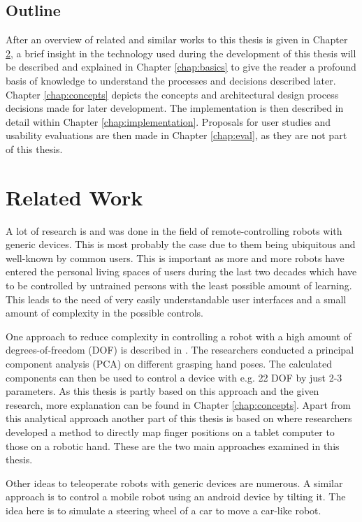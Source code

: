 \section{Outline}
After an overview of related and similar works to this thesis is given in Chapter \ref{chap:related}, a brief insight in the technology used during the development of this thesis will be described and explained in Chapter \ref{chap:basics} to give the reader a profound basis of knowledge to understand the processes and decisions described later. Chapter \ref{chap:concepts} depicts the concepts and architectural design process decisions made for later development. The implementation is then described in detail within Chapter \ref{chap:implementation}. Proposals for user studies and usability evaluations are then made in Chapter \ref{chap:eval}, as they are not part of this thesis.

\chapter{Related Work}
\label{chap:related}
A lot of research is and was done in the field of remote-controlling robots with generic devices. This is most probably the case due to them being ubiquitous and well-known by common users. This is important as more and more robots have entered the personal living spaces of users during the last two decades\cite{Forlizzi2006} which have to be controlled by untrained persons with the least possible amount of learning. This leads to the need of very easily understandable user interfaces and a small amount of complexity in the possible controls. 

One approach to reduce complexity in controlling a robot with a high amount of degrees-of-freedom (DOF) is described in \cite{Bernardino2013}. The researchers conducted a principal component analysis (PCA) on different grasping hand poses. The calculated components can then be used to control a device with e.g. 22 DOF by just 2-3 parameters. As this thesis is partly based on this approach and the given research, more explanation can be found in Chapter \ref{chap:concepts}. Apart from this analytical approach another part of this thesis is based on \cite{conf:humanoids:TohHLBZP12} where researchers developed a method to directly map finger positions on a tablet computer to those on a robotic hand. These are the two main approaches examined in this thesis.

Other ideas to teleoperate robots with generic devices are numerous. A similar approach is to control a mobile robot using an android device by tilting it\cite{Akupati2017}. The idea here is to simulate a steering wheel of a car to move a car-like robot. 

